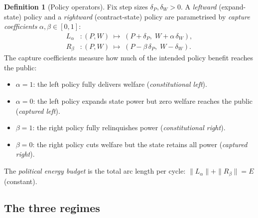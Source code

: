 \documentclass[11pt,a4paper]{article}
\theoremstyle{definition}
\newtheorem{definition}[theorem]{Definition}
\theoremstyle{remark}
\begin{document}
\begin{definition}[Policy operators]\label{def:policy-ops}
Fix step sizes $\delta_P, \delta_W > 0$.
A \emph{leftward} (expand-state) policy and a \emph{rightward}
(contract-state) policy are parametrised by
\emph{capture coefficients} $\alpha, \beta \in [0,1]$:
\begin{align}
  L_\alpha &\colon (P,W)
    \;\mapsto\; (P + \delta_P,\; W + \alpha\,\delta_W),
    \label{eq:L-op}\\
  R_\beta &\colon (P,W)
    \;\mapsto\; (P - \beta\,\delta_P,\; W - \delta_W).
    \label{eq:R-op}
\end{align}
The capture coefficients measure how much of the intended policy
benefit reaches the public:
\begin{itemize}[nosep]
\item $\alpha = 1$: the left policy fully delivers welfare
  (\emph{constitutional left}).
\item $\alpha = 0$: the left policy expands state power but zero
  welfare reaches the public (\emph{captured left}).
\item $\beta = 1$: the right policy fully relinquishes power
  (\emph{constitutional right}).
\item $\beta = 0$: the right policy cuts welfare but the state
  retains all power (\emph{captured right}).
\end{itemize}
The \emph{political energy budget} is the total arc length per cycle:
$\|L_\alpha\| + \|R_\beta\| = E$ (constant).
\end{definition}

\subsection*{The three regimes}
\end{document}
